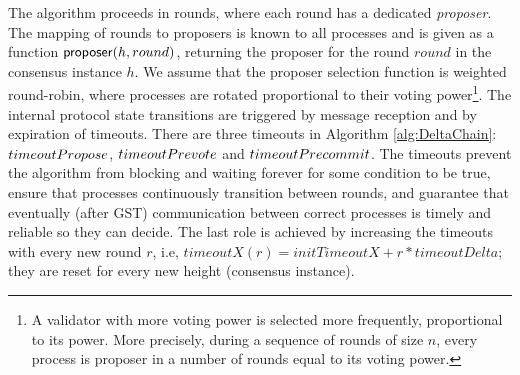 The algorithm proceeds in rounds, where each round has a dedicated
\emph{proposer}. The mapping of rounds to proposers is known to all processes
and is given as a function $\mathsf{proposer}(h, round)$, returning the proposer for
the round $round$ in the consensus instance $h$. We
assume that the proposer selection function is weighted round-robin, where
processes are rotated proportional to their voting power\footnote{A validator
with more voting power is selected more frequently, proportional to its power.
More precisely, during a sequence of rounds of size $n$, every process is
proposer in a number of rounds equal to its voting power.}. 
The internal protocol state transitions are triggered by message reception and 
by expiration of timeouts. There are three timeouts in Algorithm \ref{alg:DeltaChain}:
$timeoutPropose$, $timeoutPrevote$ and $timeoutPrecommit$.
The timeouts prevent the algorithm from blocking and
waiting forever for some condition to be true, ensure that processes continuously 
transition between rounds, and guarantee that eventually (after GST) communication 
between correct processes is timely and reliable so they can decide. 
The last role is achieved by increasing the timeouts with every new round $r$, 
i.e, $timeoutX(r) = initTimeoutX + r*timeoutDelta$; 
they are reset for every new height (consensus
instance). 

